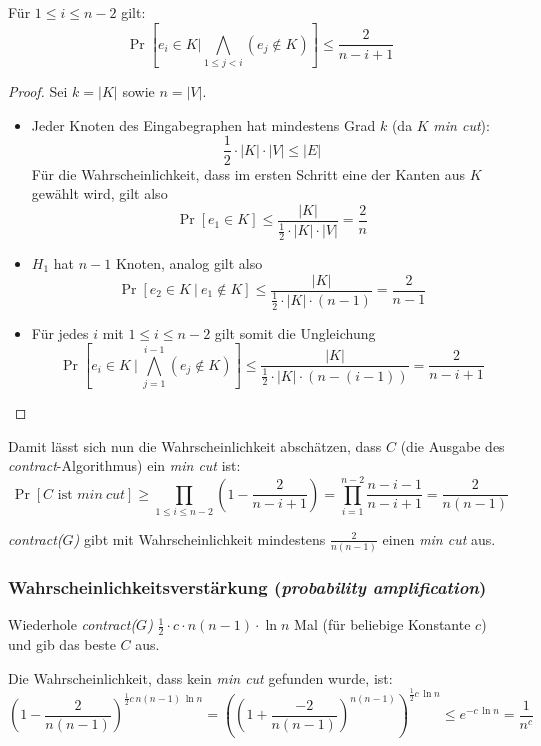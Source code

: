 \begin{lemm}
	Für $1 \leq i \leq n-2$ gilt:
	\[ \Pr\left[e_i \in K | \bigwedge_{1\leq j < i} \left(e_j \not\in K\right) \right] \leq \frac{2}{n-i+1} \]
\end{lemm}
\begin{proof} Sei $k = |K|$ sowie $n = |V|$.
	\begin{itemize}
		\item Jeder Knoten des Eingabegraphen hat mindestens Grad $k$
			(da $K$ \emph{min cut}):
			\[
			  \frac{1}{2} \cdot |K| \cdot |V| \leq |E|
			\]
			Für die Wahrscheinlichkeit, dass im ersten Schritt eine
			der Kanten aus $K$ gewählt wird, gilt also
			\[
			  \Pr\left[e_1 \in K\right] \leq
			  \frac{|K|}{\frac{1}{2}\cdot |K| \cdot |V|} =
			  \frac{2}{n}
			\]
		\item $H_1$ hat $n-1$ Knoten, analog gilt also
			\[
			  \Pr\left[e_2 \in K\ |\ e_1 \not\in K\right] \leq
			  \frac{|K|}{\frac{1}{2}\cdot |K| \cdot (n-1)} =
			  \frac{2}{n-1}
			\]
		\item Für jedes $i$ mit $1 \leq i \leq n-2$ gilt somit die Ungleichung
			\[
			  \Pr\left[e_i \in K\ \Big|\ \bigwedge_{j=1}^{i-1}
			  \left(e_j \not\in K\right)\right] \leq
			  \frac{|K|}{\frac{1}{2}\cdot |K| \cdot
			  \left(n-(i-1)\right)} = \frac{2}{n-i+1}
			\]
	\end{itemize}
\end{proof}

Damit lässt sich nun die Wahrscheinlichkeit abschätzen, dass $C$ (die Ausgabe
des \emph{contract}-Algorithmus) ein \emph{min cut} ist:
\[
  \Pr\left[ C \text{ ist } min\ cut\right] \geq \prod_{1\leq i \leq n-2}
  \left(1-\frac{2}{n-i+1}\right) = \prod_{i=1}^{n-2} \frac{n-i-1}{n-i+1} = \frac{2}{n(n-1)}
\]

\begin{satz}
	\emph{contract($G$)} gibt mit Wahrscheinlichkeit mindestens $\frac{2}{n(n-1)}$ einen \emph{min cut} aus.
\end{satz}

\subsubsection{Wahrscheinlichkeitsverstärkung (\emph{probability amplification})}
Wiederhole \emph{contract($G$)} $\frac{1}{2} \cdot c \cdot n(n-1)\cdot \ln n$
Mal (für beliebige Konstante $c$) und gib das beste $C$ aus.

Die Wahrscheinlichkeit, dass kein \emph{min cut} gefunden wurde, ist:
\[
  \left(1-\frac{2}{n(n-1)}\right)^{\frac{1}{2}c\,n(n-1)\,\ln n} =
  \left(\left(1+\frac{-2}{n(n-1)}\right)^{n(n-1)}\right)^{\frac{1}{2}c\,\ln n}
  \leq e^{-c\,\ln n} = \frac{1}{n^c}
\]

